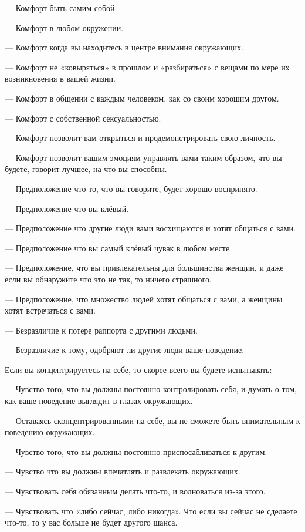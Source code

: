 --- Комфорт быть самим собой.

--- Комфорт в любом окружении.

--- Комфорт когда вы находитесь в центре внимания окружающих.

--- Комфорт не «ковыряться» в прошлом и «разбираться» с вещами по мере их возникновения в вашей жизни.

--- Комфорт в общении с каждым человеком, как со своим хорошим другом.

--- Комфорт с собственной сексуальностью.

--- Комфорт позволит вам открыться и продемонстрировать свою личность.

--- Комфорт позволит вашим эмоциям управлять вами таким образом, что вы будете, говорит лучшее, на что вы способны.

--- Предположение что то, что вы говорите, будет хорошо воспринято.

--- Предположение что вы клёвый.

--- Предположение что другие люди вами восхищаются и хотят общаться с вами.

--- Предположение что вы самый клёвый чувак в любом месте.

--- Предположение, что вы привлекательны для большинства женщин, и даже если вы обнаружите что это не так, то ничего страшного.

--- Предположение, что множество людей хотят общаться с вами, а женщины хотят встречаться с вами.

--- Безразличие к потере раппорта с другими людьми.

--- Безразличие к тому, одобряют ли другие люди ваше поведение.

Если вы концентрируетесь на себе, то скорее всего вы будете испытывать:

--- Чувство того, что вы должны постоянно контролировать себя, и думать о том, как ваше поведение выглядит в глазах окружающих.

--- Оставаясь сконцентрированными на себе, вы не сможете быть внимательным к поведению окружающих.

--- Чувство того, что вы должны постоянно приспосабливаться к другим.

--- Чувство что вы должны впечатлять и развлекать окружающих.

--- Чувствовать себя обязанным делать что-то, и волноваться из-за этого.

--- Чувствовать что «либо сейчас, либо никогда». Что если вы сейчас не сделаете что-то, то у вас больше не будет другого шанса.

